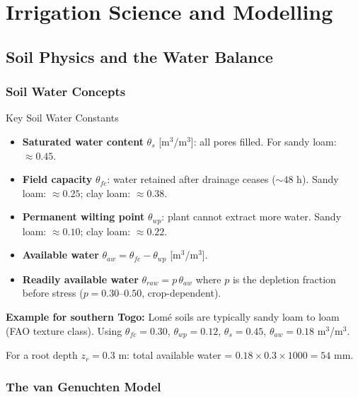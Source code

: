 \documentclass[12pt,a4paper,openany]{book}
\begin{document}
\part{Irrigation Science and Modelling}

\chapter{Soil Physics and the Water Balance}
\label{chap:soil}

\section{Soil Water Concepts}

\begin{defbox}{Key Soil Water Constants}
\begin{itemize}[leftmargin=1.5em]
  \item \textbf{Saturated water content} $\theta_s$ [m$^3$/m$^3$]: all pores filled. For sandy loam: $\approx0.45$.
  \item \textbf{Field capacity} $\theta_{fc}$: water retained after drainage ceases ($\sim48$ h). Sandy loam: $\approx0.25$; clay loam: $\approx0.38$.
  \item \textbf{Permanent wilting point} $\theta_{wp}$: plant cannot extract more water. Sandy loam: $\approx0.10$; clay loam: $\approx0.22$.
  \item \textbf{Available water} $\theta_{aw}=\theta_{fc}-\theta_{wp}$ [m$^3$/m$^3$].
  \item \textbf{Readily available water} $\theta_{raw}=p\,\theta_{aw}$ where $p$ is the depletion fraction before stress ($p=0.30$--$0.50$, crop-dependent).
\end{itemize}
\end{defbox}

\textbf{Example for southern Togo:} Lomé soils are typically sandy loam to loam (FAO texture class). Using $\theta_{fc}=0.30$, $\theta_{wp}=0.12$, $\theta_s=0.45$, $\theta_{aw}=0.18$ m$^3$/m$^3$.

For a root depth $z_r=0.3$ m: total available water = $0.18\times0.3\times1000=54$ mm.

\section{The van Genuchten Model}
\end{document}
